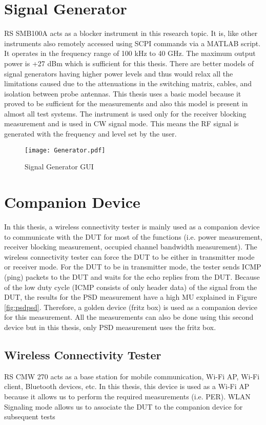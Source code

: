 \section{Signal Generator}
\acs{RS}\textregistered{} SMB100A acts as a blocker instrument in this research topic. It is, like other instruments also remotely accessed using \acs{SCPI} commands via a MATLAB\textregistered{} script. It operates in the frequency range of 100 kHz to 40 GHz. The maximum output power is +27 dBm which is sufficient for this thesis. There are better models of signal generators having higher power levels and thus would relax all the limitations caused due to the attenuations in the switching matrix, cables, and isolation between probe antennas. This thesis uses a basic model because it proved to be sufficient for the measurements and also this model is present in almost all test systems. The instrument is used only for the receiver blocking measurement and is used in \acs{CW} signal mode. This means the \acs{RF} signal is generated with the frequency and level set by the user.

\begin{figure}[H]
\centering
\texttt{[image: Generator.pdf]}
\caption{Signal Generator \acs{GUI}}
\label{fig:gen}
\end{figure}

\section{Companion Device}
In this thesis, a wireless connectivity tester is mainly used as a companion device to communicate with the \acs{DUT} for most of the functions (i.e. power measurement, receiver blocking measurement, occupied channel bandwidth measurement). The wireless connectivity tester can force the \acs{DUT} to be either in transmitter mode or receiver mode. For the \acs{DUT} to be in transmitter mode, the tester sends \acf{ICMP} (ping) packets to the \acs{DUT} and waits for the echo replies from the \acs{DUT}. Because of the low duty cycle (\acs{ICMP} consists of only header data) of the signal from the \acs{DUT}, the results for the \acs{PSD} measurement have a high \ac{MU} explained in Figure \ref{fig:psdpsd}. Therefore, a golden device (fritz box) is used as a companion device for this measurement. All the measurements can also be done using this second device but in this thesis, only \ac{PSD} measurement uses the fritz box.

\subsection{Wireless Connectivity Tester} \label{sec:cmw}
\acs{RS}\textregistered{} CMW 270 acts as a base station for mobile communication, Wi-Fi\texttrademark{} \acs{AP}, Wi-Fi\texttrademark{} client, Bluetooth\textregistered{} devices, etc. In this thesis, this device is used as a Wi-Fi\texttrademark{} \acs{AP} because it allows us to perform the required measurements (i.e. \acf{PER}). \acs{WLAN} Signaling mode allows us to associate the \acs{DUT} to the companion device for subsequent tests

